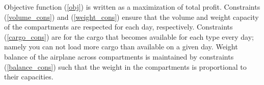 \documentclass[11pt,a4paper]{article}
\begin{document}
Objective function (\ref{obj}) is written as a maximization of total profit. Constraints (\ref{volume_cons}) and (\ref{weight_cons}) ensure that the volume and weight capacity of the compartments are respected for each day, respectively. Constraints (\ref{cargo_cons}) are for the cargo that becomes available for each type every day; namely you can not load more cargo than available on a given day. Weight balance of the airplane across compartments is maintained by constraints (\ref{balance_cons}) such that the weight in the compartments is proportional to their capacities. 


       
\end{document}
